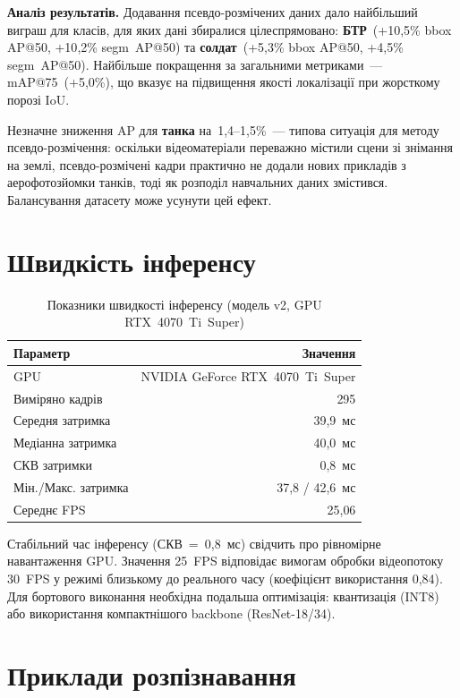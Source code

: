 \documentclass[14pt,a4paper]{extreport}
\begin{document}
\textbf{Аналіз результатів.} Додавання псевдо-розмічених даних дало
найбільший виграш для класів, для яких дані збиралися цілеспрямовано:
\textbf{БТР}~(+10{,}5\% bbox AP@50, +10{,}2\% segm~AP@50) та
\textbf{солдат}~(+5{,}3\% bbox AP@50, +4{,}5\% segm~AP@50). Найбільше
покращення за загальними метриками~--- mAP@75~(+5{,}0\%), що вказує на
підвищення якості локалізації при жорсткому порозі IoU.

Незначне зниження AP для \textbf{танка} на~1{,}4--1{,}5\%~--- типова
ситуація для методу псевдо-розмічення: оскільки відеоматеріали
переважно містили сцени зі знімання на землі, псевдо-розмічені кадри
практично не додали нових прикладів з аерофотозйомки танків, тоді як
розподіл навчальних даних змістився. Балансування датасету може усунути
цей ефект.

\section{Швидкість інференсу}

\begin{table}[H]
\caption{Показники швидкості інференсу (модель v2, GPU RTX~4070~Ti~Super)}
\label{tab:speed}
\centering
\begin{tabular}{@{}lr@{}}
\toprule
Параметр & Значення \\
\midrule
GPU & NVIDIA GeForce RTX~4070~Ti~Super \\
Виміряно кадрів & 295 \\
Середня затримка & 39{,}9~мс \\
Медіанна затримка & 40{,}0~мс \\
СКВ затримки & 0{,}8~мс \\
Мін./Макс. затримка & 37{,}8 / 42{,}6~мс \\
Середнє FPS & 25{,}06 \\
\bottomrule
\end{tabular}
\end{table}

Стабільний час інференсу (СКВ~=~0{,}8~мс) свідчить про рівномірне
навантаження GPU. Значення 25~FPS відповідає вимогам обробки відеопотоку
30~FPS у режимі близькому до реального часу (коефіцієнт використання
0{,}84). Для бортового виконання необхідна подальша оптимізація:
квантизація (INT8) або використання компактнішого backbone
(ResNet-18/34).

\section{Приклади розпізнавання}
\end{document}
